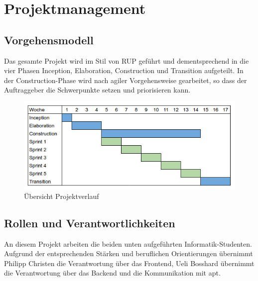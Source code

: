 
\chapter{Projektmanagement}
\section{Vorgehensmodell}

Das gesamte Projekt wird im Stil von RUP geführt und dementsprechend in die vier Phasen Inception, Elaboration, Construction und Transition aufgeteilt. In der Construction-Phase wird nach agiler Vorgehensweise gearbeitet, so dass der Auftraggeber die Schwerpunkte setzen und priorisieren kann.

\begin{figure}[H]
	\centering
	\includegraphics[width=\linewidth]{fig/project_overview}
	\caption{Übersicht Projektverlauf}
	\label{fig:pm:project_overview}
\end{figure}

\section{Rollen und Verantwortlichkeiten}

An diesem Projekt arbeiten die beiden unten aufgeführten Informatik-Studenten. Aufgrund der entsprechenden Stärken und beruflichen Orientierungen übernimmt Philipp Christen die Verantwortung über das Frontend, Ueli Bosshard übernimmt die Verantwortung über das Backend und die Kommunikation mit apt.

